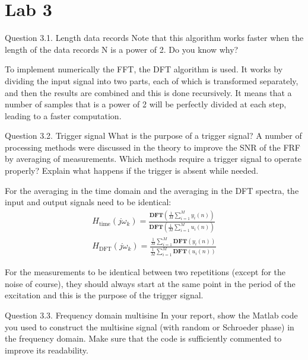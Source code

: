 \setcounter{secnumdepth}{1}

\chapter{Lab 3}


\begin{Task}{Question 3.1. Length data records}
    Note that this algorithm works faster when the length of the data records N is a power of 2. Do you know why?
\end{Task}

To implement numerically the FFT, the DFT algorithm is used. It works by dividing the input signal into two parts, each of which is transformed separately, and then the results are combined and this is done recursively. It means that a number of samples that is a power of 2 will be perfectly divided at each step, leading to a faster computation.

\begin{Task}{Question 3.2. Trigger signal}
    What is the purpose of a trigger signal? A number of processing methods were discussed in the theory to improve the SNR of the FRF by averaging of measurements. Which methods require a trigger signal to operate properly? Explain what happens if the trigger is absent while needed.
\end{Task}

For the averaging in the time domain and the averaging in the DFT spectra, the input and output signals need to be identical:
\begin{align*}
    H_{\text{time}}(j\omega_k) = \frac{\textbf{DFT}\left(\frac{1}{M}\sum_{i=1}^{M}y_i(n)\right)}{\textbf{DFT}\left(\frac{1}{M}\sum_{i=1}^{M}u_i(n)\right)}\\
    H_{\text{DFT}}(j\omega_k) = \frac{\frac{1}{M}\sum_{i=1}^{M}\textbf{DFT}\left(y_i(n)\right)}{\frac{1}{M}\sum_{i=1}^{M}\textbf{DFT}\left(u_i(n)\right)}
\end{align*}

For the measurements to be identical between two repetitions (except for the noise of course), they should always start at the same point in the period of the excitation and this is the purpose of the trigger signal.

\begin{Task}{Question 3.3. Frequency domain multisine}
    In your report, show the Matlab code you used to construct the multisine signal (with random or Schroeder phase) in the frequency domain. Make sure that the code is sufficiently commented to improve its readability.
\end{Task}

